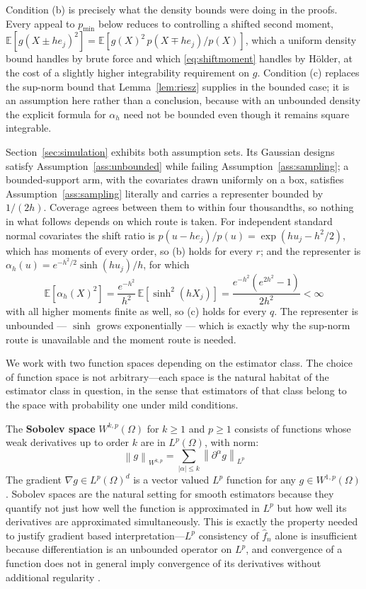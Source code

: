 \documentclass[12pt]{article}
\newcommand{\norm}[1]{\left\| #1 \right\|}
\newcommand{\E}{\mathbb{E}}
\newcommand{\Lp}{L^p(\Omega)}
\newcommand{\Wonep}{W^{1,p}(\Omega)}
\newcommand{\fn}{\hat{f}_n}
\begin{document}
	Condition (b) is precisely what the density bounds were doing in the proofs. Every
	appeal to $p_{\min}$ below reduces to controlling a shifted second moment,
	$\E[g(X \pm h e_j)^2] = \E[g(X)^2\, p(X \mp h e_j)/p(X)]$, which a uniform density
	bound handles by brute force and which \eqref{eq:shiftmoment} handles by
	H\"{o}lder, at the cost of a slightly higher integrability requirement on $g$.
	Condition (c) replaces the sup-norm bound that Lemma~\ref{lem:riesz} supplies in
	the bounded case; it is an assumption here rather than a conclusion, because with
	an unbounded density the explicit formula for $\alpha_h$ need not be bounded even
	though it remains square integrable.

	Section~\ref{sec:simulation} exhibits both assumption sets. Its Gaussian
	designs satisfy Assumption~\ref{ass:unbounded} while failing
	Assumption~\ref{ass:sampling}; a bounded-support arm, with the covariates
	drawn uniformly on a box, satisfies Assumption~\ref{ass:sampling} literally and
	carries a representer bounded by $1/(2h)$. Coverage agrees between them to within
	four thousandths, so nothing in what follows depends on which route is taken. For
	independent standard normal covariates the shift ratio is
	$p(u - h e_j)/p(u) = \exp(h u_j - h^2/2)$, which has moments of every order, so (b)
	holds for every $r$; and the representer is
	$\alpha_h(u) = e^{-h^2/2}\sinh(h u_j)/h$, for which
	\begin{equation}
		\E\left[\alpha_h(X)^2\right]
		= \frac{e^{-h^2}}{h^2}\,\E\left[\sinh^2(h X_j)\right]
		= \frac{e^{-h^2}\left(e^{2h^2} - 1\right)}{2h^2} < \infty
		\label{eq:gaussalpha}
	\end{equation}
	with all higher moments finite as well, so (c) holds for every $q$. The
	representer is unbounded --- $\sinh$ grows exponentially --- which is exactly why
	the sup-norm route is unavailable and the moment route is needed.
	
	We work with two function spaces depending on the estimator class. The choice of
	function space is not arbitrary---each space is the natural habitat of the estimator
	class in question, in the sense that estimators of that class belong to the space
	with probability one under mild conditions.
	
	The \textbf{Sobolev space} $W^{k,p}(\Omega)$ for $k \geq 1$ and $p \geq 1$
	consists of functions whose weak derivatives up to order $k$ are in $\Lp$, with
	norm:
	\begin{equation}
		\norm{g}_{W^{k,p}} = \sum_{|\alpha| \leq k} \norm{\partial^\alpha g}_{L^p}
	\end{equation}
	The gradient $\nabla g \in L^p(\Omega)^d$ is a vector valued $L^p$ function for any
	$g \in \Wonep$. Sobolev spaces are the natural setting for smooth estimators because
	they quantify not just how well the function is approximated in $L^p$ but how well
	its derivatives are approximated simultaneously. This is exactly the property needed
	to justify gradient based interpretation---$L^p$ consistency of $\fn$ alone is
	insufficient because differentiation is an unbounded operator on $L^p$, and
	convergence of a function does not in general imply convergence of its derivatives
	without additional regularity \citep[Chapter~5]{evans2010pde}.
	
\end{document}
